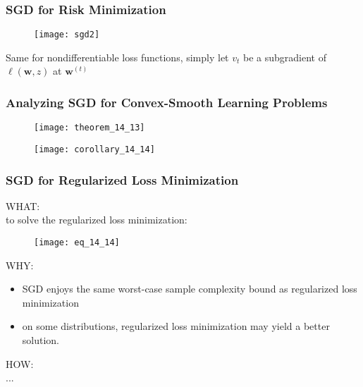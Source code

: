 \begin{frame}
\frametitle{SGD for Risk Minimization}

\begin{figure}
    \centering
    \texttt{[image: sgd2]}
\end{figure}

Same for nondifferentiable loss functions,
simply let $v_t$ be a subgradient of $\ell(\mathbf{w}, z)$ at $\mathbf{w}^{(t)}$

\end{frame}

\begin{frame}
\frametitle{Analyzing SGD for Convex-Smooth Learning Problems}

\begin{figure}
    \centering
    \texttt{[image: theorem\_14\_13]}
\end{figure}

\begin{figure}
    \centering
    \texttt{[image: corollary\_14\_14]}
\end{figure}

\end{frame}

\begin{frame}
\frametitle{SGD for Regularized Loss Minimization}

WHAT:\\
to solve the regularized loss minimization:
\begin{figure}
    \centering
    \texttt{[image: eq\_14\_14]}
\end{figure}

WHY:\\
\begin{itemize}
\item SGD enjoys the same worst-case sample complexity bound as regularized loss minimization
\item on some distributions, regularized loss minimization may yield a better solution.
\end{itemize}

HOW:\\
...
\end{frame}


